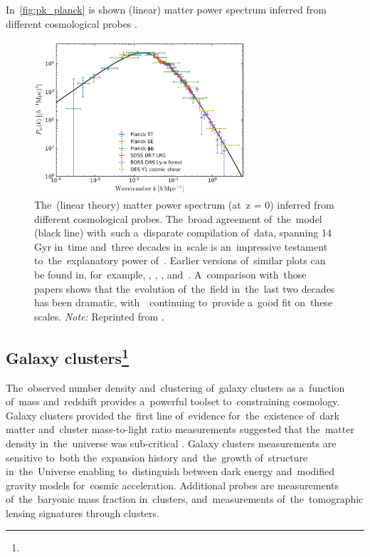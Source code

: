In~\autoref{fig:pk_planck} is shown (linear) matter power spectrum inferred from different cosmological probes \parencite{2018arXiv180706205P}.
\begin{figure}[hbt]
    \centering
    \includegraphics[width=0.7\textwidth]{cosmo_evol/pk_planck.png}
    \caption{The~(linear theory) matter power spectrum (at~z = 0) inferred from different cosmological probes. The~broad agreement of~the~model (black line) with~such a~disparate compilation of~data, spanning 14 Gyr in~time and~three decades in~scale is an~impressive testament to~the~explanatory power of~\LCDM. Earlier versions of~similar plots can be found in, for~example, \textcite{1994ARA&A..32..319W}, \textcite{1995Sci...268..829S}, \textcite{2002PhRvD..66j3508T}, and~\textcite{2004ApJ...606..702T}. A~comparison with~those papers shows that the~evolution of~the~field in~the~last two decades has been dramatic, with~\LCDM\ continuing to~provide a~good fit on~these scales. \textit{Note:} Reprinted from \textcite{2018arXiv180706205P}.}
    \label{fig:pk_planck}
\end{figure}

\DIFdelbegin %
\DIFdelend \DIFaddbegin \subsection[Galaxy clusters]{\DIFaddend Galaxy clusters\DIFaddbegin \footnote{}\DIFaddend }
\DIFaddbegin \label{ssec:gc}
\DIFaddend The~observed number density and~clustering of~galaxy clusters as a~function of~mass and~redshift provides a~powerful toolset to~constraining cosmology.  Galaxy clusters provided the~first line of~evidence for~the~existence of~dark matter \textcite{zwicky} and~cluster mass-to-light ratio measurements suggested that the~matter density in~the~universe was sub-critical \textcite{Gott}. Galaxy clusters measurements are sensitive to~both the~expansion history and~the~growth of~structure in~the~Universe enabling to~distinguish between dark energy and~modified gravity models for~cosmic acceleration. Additional probes are measurements of~the~baryonic mass fraction in~clusters, and~measurements of~the~tomographic lensing signatures through clusters.

